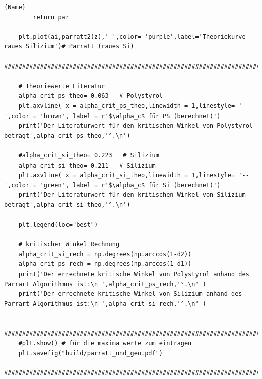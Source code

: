 \begin{lstlisting}{Name}
        return par
    
    plt.plot(ai,parratt2(z),'-',color= 'purple',label='Theoriekurve raues Silizium')# Parratt (raues Si) 
    ########################################################################################################
    
    # Theoriewerte Literatur
    alpha_crit_ps_theo= 0.063   # Polystyrol
    plt.axvline( x = alpha_crit_ps_theo,linewidth = 1,linestyle= '--',color = 'brown', label = r'$\alpha_c$ für PS (berechnet)')
    print('Der Literaturwert für den kritischen Winkel von Polystyrol beträgt',alpha_crit_ps_theo,'°.\n')
    
    #alpha_crit_si_theo= 0.223   # Silizium
    alpha_crit_si_theo= 0.211   # Silizium 
    plt.axvline( x = alpha_crit_si_theo,linewidth = 1,linestyle= '--',color = 'green', label = r'$\alpha_c$ für Si (berechnet)')
    print('Der Literaturwert für den kritischen Winkel von Silizium beträgt',alpha_crit_si_theo,'°.\n')
    
    plt.legend(loc="best")
    
    # kritischer Winkel Rechnung
    alpha_crit_si_rech = np.degrees(np.arccos(1-d2))
    alpha_crit_ps_rech = np.degrees(np.arccos(1-d1))
    print('Der errechnete kritische Winkel von Polystyrol anhand des Parrart Algorithmus ist:\n ',alpha_crit_ps_rech,'°.\n' )
    print('Der errechnete kritische Winkel von Silizium anhand des Parrart Algorithmus ist:\n ',alpha_crit_si_rech,'°.\n' )
    
    ########################################################################################################
    #plt.show() # für die maxima werte zum eintragen
    plt.savefig("build/parratt_und_geo.pdf")
    ########################################################################################################
 
\end{lstlisting}
 
\nocite{*}
\printbibliography{}
